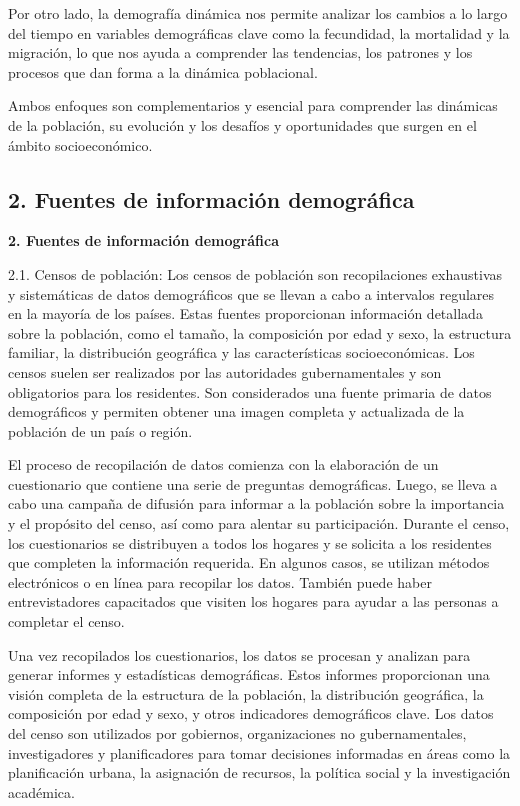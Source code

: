 \documentclass[8pt,a4paper]{beamer}
\begin{document}
{\begin{frame}{}
\begin{block}{}
Por otro lado, la demografía dinámica nos permite analizar los cambios a lo largo del tiempo en variables demográficas clave como la fecundidad, la mortalidad y la migración, lo que nos ayuda a comprender las tendencias, los patrones y los procesos que dan forma a la dinámica poblacional.

Ambos enfoques son complementarios y esencial para comprender las dinámicas de la población, su evolución y los desafíos y oportunidades que surgen en el ámbito socioeconómico.
\end{block}
\end{frame}

\subsection{2. Fuentes de información demográfica}
\begin{frame}{\textbf{2. Fuentes de información demográfica}}
\begin{block}{2.1. Censos de población:}
\justifying
Los censos de población son recopilaciones exhaustivas y sistemáticas de datos demográficos que se llevan a cabo a intervalos regulares en la mayoría de los países. Estas fuentes proporcionan información detallada sobre la población, como el tamaño, la composición por edad y sexo, la estructura familiar, la distribución geográfica y las características socioeconómicas. Los censos suelen ser realizados por las autoridades gubernamentales y son obligatorios para los residentes. Son considerados una fuente primaria de datos demográficos y permiten obtener una imagen completa y actualizada de la población de un país o región.

El proceso de recopilación de datos comienza con la elaboración de un cuestionario que contiene una serie de preguntas demográficas. Luego, se lleva a cabo una campaña de difusión para informar a la población sobre la importancia y el propósito del censo, así como para alentar su participación.
Durante el censo, los cuestionarios se distribuyen a todos los hogares y se solicita a los residentes que completen la información requerida. En algunos casos, se utilizan métodos electrónicos o en línea para recopilar los datos. También puede haber entrevistadores capacitados que visiten los hogares para ayudar a las personas a completar el censo.

\end{block}
\end{frame}

\begin{frame}{}
\begin{block}{}
\justifying
Una vez recopilados los cuestionarios, los datos se procesan y analizan para generar informes y estadísticas demográficas. Estos informes proporcionan una visión completa de la estructura de la población, la distribución geográfica, la composición por edad y sexo, y otros indicadores demográficos clave. Los datos del censo son utilizados por gobiernos, organizaciones no gubernamentales, investigadores y planificadores para tomar decisiones informadas en áreas como la planificación urbana, la asignación de recursos, la política social y la investigación académica.
\end{block}


\end{frame}}
\end{document}
